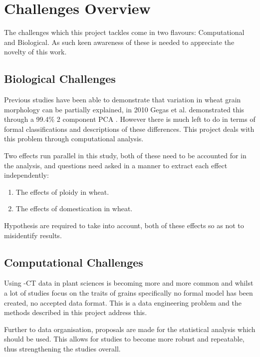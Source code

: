 \documentclass[11pt]{report}
\begin{document}
\section{Challenges Overview}
\label{sec:org1dd4669}

The challenges which this project tackles come in two flavours: Computational and Biological. As such keen awareness of these is needed to appreciate the novelty of this work.

\subsection{Biological Challenges}
\label{sec:orgf3b9e47}
Previous studies have been able to demonstrate that variation in wheat grain morphology can be partially explained, in 2010 Gegas et al. demonstrated this through a 99.4\% 2 component PCA \cite{Gegas2010}. However there is much left to do in terms of formal classifications and descriptions of these differences. This project deals with this problem through computational analysis.

Two effects run parallel in this study, both of these need to be accounted for in the analysis, and questions need asked in a manner to extract each effect independently:

\begin{enumerate}
\item The effects of ploidy in wheat.
\item The effects of domestication in wheat.
\end{enumerate}

Hypothesis are required to take into account, both of these effects so as not to misidentify results.

\subsection{Computational Challenges}
\label{sec:org5afedfa}
Using \textmu{}-CT data in plant sciences is becoming more and more common \cite{Tracy2017,Jhala2015,Hughes2017,Metzner2015} and whilst a lot of studies focus on the traits of grains specifically no formal model has been created, no accepted data format. This is a data engineering problem and the methods described in this project address this.

Further to data organisation, proposals are made for the statistical analysis which should be used. This allows for studies to become more robust and repeatable, thus strengthening the studies overall.
\end{document}
